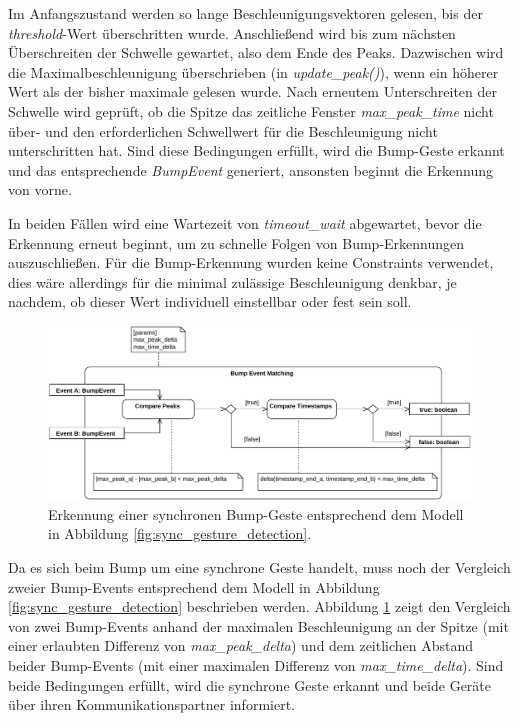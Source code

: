Im Anfangszustand werden so lange Beschleunigungsvektoren gelesen, bis der \textit{thresh\-old}-Wert überschritten wurde. Anschließend wird bis zum nächsten Überschreiten der Schwelle gewartet, also dem Ende des Peaks. Dazwischen wird die Maximalbeschleunigung überschrieben (in \textit{update\_peak()}), wenn ein höherer Wert als der bisher maximale gelesen wurde. Nach erneutem Unterschreiten der Schwelle wird geprüft, ob die Spitze das zeitliche Fenster \textit{max\_peak\_time} nicht über- und den erforderlichen Schwellwert für die Beschleunigung nicht unterschritten hat. Sind diese Bedingungen erfüllt, wird die Bump-Geste erkannt und das entsprechende \textit{BumpEvent} generiert, ansonsten beginnt die Erkennung von vorne. 

In beiden Fällen wird eine Wartezeit von \textit{timeout\_wait} abgewartet, bevor die Erkennung erneut beginnt, um zu schnelle Folgen von Bump-Erkennungen auszuschließen. Für die Bump-Erkennung wurden keine Constraints verwendet, dies wäre allerdings \zb für die minimal zulässige Beschleunigung denkbar, je nachdem, ob dieser Wert individuell einstellbar oder fest sein soll.

\begin{figure}[h]
\centering
\includegraphics[page=1,width=1\textwidth]{bilder/bump/event_matching}
\caption{Erkennung einer synchronen Bump-Geste entsprechend dem Modell in Abbildung \ref{fig:sync_gesture_detection}.}
\label{fig:bump_event_matching}
\end{figure}

Da es sich beim Bump um eine synchrone Geste handelt, muss noch der Vergleich zweier Bump-Events entsprechend dem Modell in Abbildung \ref{fig:sync_gesture_detection} beschrieben werden. Abbildung \ref{fig:bump_event_matching} zeigt den Vergleich von zwei Bump-Events anhand der maximalen Beschleunigung an der Spitze (mit einer erlaubten Differenz von \textit{max\_peak\_delta}) und dem zeitlichen Abstand beider Bump-Events (mit einer maximalen Differenz von \textit{max\_time\_delta}). Sind beide Bedingungen erfüllt, wird die synchrone Geste erkannt und beide Geräte über ihren Kommunikationspartner informiert.

